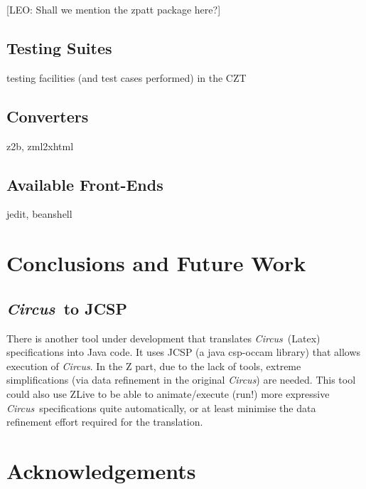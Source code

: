 \documentclass{llncs}
\newcommand{\Circus}{{\sf\slshape Circus}}
\begin{document}
[LEO: Shall we mention the zpatt package here?]

\subsection{Testing Suites}

testing facilities (and test cases performed) in the CZT

\subsection{Converters}

z2b, zml2xhtml

\subsection{Available Front-Ends}

jedit, beanshell

\section{Conclusions and Future Work} \label{sec:conclusions}

\subsection{\Circus\ to JCSP}

        There is another tool under development that translates \Circus\ (Latex) specifications into Java code.
        It uses JCSP (a java csp-occam library) that allows execution of \Circus.
        In the Z part, due to the lack of tools, extreme simplifications (via data refinement in the original \Circus)
        are needed.
        This tool could also use ZLive to be able to animate/execute (run!) more expressive \Circus\ specifications quite
        automatically, or at least minimise the data refinement effort required for the translation.


\section*{Acknowledgements}



\end{document}
